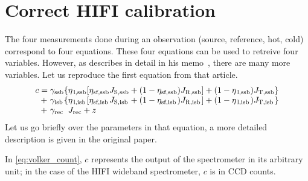 \section{Correct HIFI calibration}
The four measurements done during an observation (source, reference, hot, cold) correspond to four equations.
These four equations can be used to retreive four variables.
However, as \citeauthor{ossenkopf2002intensity} describes in detail in his memo~\cite{ossenkopf2002intensity}, there are many more variables.
Let us reproduce the first equation from that article.
\begin{equation}
    \begin{array}{*{15}{@{}>{{}}l<{{}}@{}}}
            c
        &
            =
        &
            \gamma_\text{ssb}
        &
            \lbrace
            \eta_\text{\,l,ssb}
        &
            [
                \eta_\text{sf,ssb}
        &
                J_\text{S,ssb}
        &
                +
        &
                (1 - \eta_\text{sf,ssb}
        &
                )
        &
                J_\text{R,ssb}
        &
            ]
        &
            +
            (1 - \eta_\text{\,l,ssb}
        &
            )
        &
            J_\text{T,ssb}
        &
            \rbrace
        \\
        &
            +
        &
            \gamma_\text{isb}
        &
            \lbrace
            \eta_\text{\,l,isb}
        &
            [
                \eta_\text{sf,isb}
        &
                J_\text{S,isb}
        &
                +
        &
                (1 - \eta_\text{sf,isb}
        &
                )
        &
                J_\text{R,isb}
        &
            ]
        &
            +
            (1 - \eta_\text{\,l,isb}
        &
            )
        &
            J_\text{T,isb}
        &
            \rbrace
        \\
        &
            +
        &
            \gamma_\text{rec}
        &
            \multicolumn{12}{l}{
                 J_\text{rec} + z
            }
    \end{array}
    \label{eq:volker_count}
\end{equation}
Let us go briefly over the parameters in that equation, a more detailed description is given in the original paper.

In \cref{eq:volker_count}, $c$ represents the output of the spectrometer in its arbitrary unit; in the case of the HIFI wideband spectrometer, $c$ is in CCD counts.

